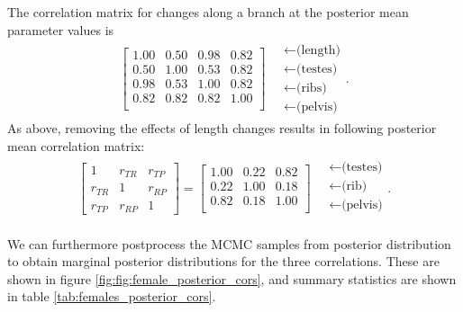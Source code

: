 \documentclass{article}
\begin{document}
The correlation matrix for changes along a branch at the posterior mean parameter values is 
\begin{align}
\begin{bmatrix}
  1.00 & 0.50 & 0.98 & 0.82 \\ 
  0.50 & 1.00 & 0.53 & 0.82 \\ 
  0.98 & 0.53 & 1.00 & 0.82 \\ 
  0.82 & 0.82 & 0.82 & 1.00 \\ 
\end{bmatrix}
\quad \begin{matrix}
  \leftarrow \text{(length)} \\
  \leftarrow \text{(testes)} \\
  \leftarrow \text{(ribs)} \\
  \leftarrow \text{(pelvis)} 
\end{matrix} .
\end{align}
As above, removing the effects of length changes results in following posterior mean correlation matrix:
\begin{align}
\begin{bmatrix}
  1 & r_{TR} & r_{TP} \\ 
  r_{TR} & 1 & r_{RP} \\ 
  r_{TP} & r_{RP} & 1 
 \end{bmatrix}
 =
\begin{bmatrix}
   1.00 & 0.22 & 0.82 \\ 
   0.22 & 1.00 & 0.18 \\ 
   0.82 & 0.18 & 1.00 \\ 
 \end{bmatrix}
\quad \begin{matrix}
  \leftarrow \text{(testes)} \\
  \leftarrow \text{(rib)} \\
  \leftarrow \text{(pelvis)} \\
\end{matrix}  .
\end{align}

We can furthermore postprocess the MCMC samples from posterior distribution
to obtain marginal posterior distributions for the three correlations.
These are shown in figure \ref{fig:fig:female_posterior_cors},
and summary statistics are shown in table \ref{tab:females_posterior_cors}.
\end{document}

